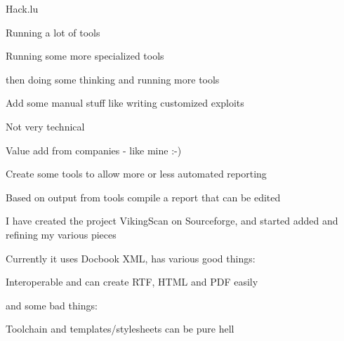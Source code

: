 \documentclass[18pt,landscape,a4paper]{foils}
\begin{document}
{Hack.lu}



\begin{list1}
\item Running a lot of tools
\item Running some more specialized tools
\item then doing some thinking and running more tools
\item Add some manual stuff like writing customized exploits
\end{list1}


\begin{list1}
\item Not very technical
\item Value add from companies - like mine :-)  
\end{list1}


\begin{list1}
\item Create some tools to allow more or less automated reporting  
\item Based on output from tools compile a report that can be edited
\end{list1}


\begin{list1}
\item I have created the project VikingScan on Sourceforge, and
  started added and refining my various pieces   
\end{list1}



\begin{list1}
\item Currently it uses Docbook XML, has various good things:
\begin{list2}
\item Interoperable and can create RTF, HTML and PDF easily    
\end{list2}
\item and some bad things:
\begin{list2}
\item Toolchain and templates/stylesheets can be pure hell    
\end{list2}
\end{list1}
\end{document}
